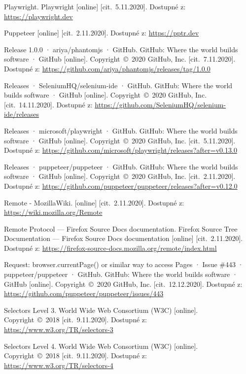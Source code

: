 \begin{thebibliography}{99}
 Playwright. Playwright [online] [cit.~5.11.2020]. Dostupné z: \url{https://playwright.dev}

 Puppeteer [online] [cit.~2.11.2020]. Dostupné z: \url{https://pptr.dev}

 Release 1.0.0 · ariya/phantomjs · GitHub. GitHub: Where the world builds software · GitHub [online]. Copyright~©~2020 GitHub, Inc. [cit.~7.11.2020]. Dostupné z: \url{https://github.com/ariya/phantomjs/releases/tag/1.0.0}

 Releases · SeleniumHQ/selenium-ide · GitHub. GitHub: Where the world builds software · GitHub [online]. Copyright~©~2020 GitHub, Inc. [cit.~14.11.2020]. Dostupné z: \url{https://github.com/SeleniumHQ/selenium-ide/releases}

 Releases · microsoft/playwright · GitHub. GitHub: Where the world builds software · GitHub [online]. Copyright~©~2020 GitHub, Inc. [cit.~5.11.2020]. Dostupné z: \url{https://github.com/microsoft/playwright/releases?after=v0.13.0}

 Releases · puppeteer/puppeteer · GitHub. GitHub: Where the world builds software · GitHub [online]. Copyright~©~2020 GitHub, Inc. [cit.~2.11.2020]. Dostupné z: \url{https://github.com/puppeteer/puppeteer/releases?after=v0.12.0}

 Remote - MozillaWiki. [online] [cit.~2.11.2020]. Dostupné z: \url{https://wiki.mozilla.org/Remote}

 Remote Protocol — Firefox Source Docs documentation. Firefox Source Tree Documentation — Firefox Source Docs documentation [online] [cit.~2.11.2020]. Dostupné z: \url{https://firefox-source-docs.mozilla.org/remote/index.html}

 Request: browser.currentPage() or similar way to access Pages · Issue \#443 · puppeteer/puppeteer · GitHub. GitHub: Where the world builds software · GitHub [online]. Copyright~©~2020 GitHub, Inc. [cit.~12.12.2020]. Dostupné z: \url{https://github.com/puppeteer/puppeteer/issues/443}

 Selectors Level 3. World Wide Web Consortium (W3C) [online]. Copyright~©~2018 [cit.~9.11.2020]. Dostupné z: \url{https://www.w3.org/TR/selectors-3}

 Selectors Level 4. World Wide Web Consortium (W3C) [online]. Copyright~©~2018 [cit.~9.11.2020]. Dostupné z: \url{https://www.w3.org/TR/selectors-4}


\end{thebibliography}
